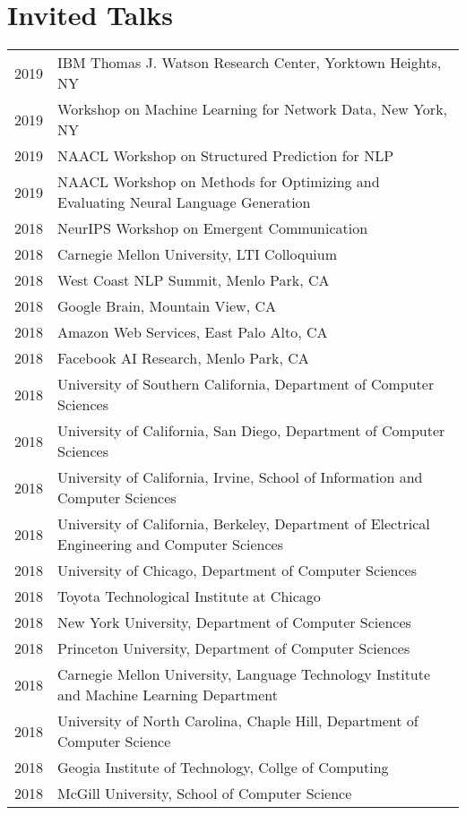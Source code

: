 \documentclass[a4paper,11pt]{article}
\begin{document}
\section{Invited Talks}
\begin{longtable}{rl}
    2019 & IBM Thomas J. Watson Research Center, Yorktown Heights, NY \\
    2019 & Workshop on Machine Learning for Network Data, New York, NY \\
    2019 & NAACL Workshop on Structured Prediction for NLP \\
    2019 & NAACL Workshop on Methods for Optimizing and Evaluating Neural Language Generation \\
    2018 & NeurIPS Workshop on Emergent Communication \\
    2018 & Carnegie Mellon University, LTI Colloquium \\
    2018 & West Coast NLP Summit, Menlo Park, CA \\
    2018 & Google Brain, Mountain View, CA \\
    2018 & Amazon Web Services, East Palo Alto, CA \\
    2018 & Facebook AI Research, Menlo Park, CA \\
    2018 & University of Southern California, Department of Computer Sciences \\
    2018 & University of California, San Diego, Department of Computer Sciences \\
    2018 & University of California, Irvine, School of Information and Computer Sciences \\
    2018 & University of California, Berkeley, Department of Electrical Engineering and Computer Sciences \\
    2018 & University of Chicago, Department of Computer Sciences \\
    2018 & Toyota Technological Institute at Chicago \\
    2018 & New York University, Department of Computer Sciences \\
    2018 & Princeton University, Department of Computer Sciences \\
    2018 & Carnegie Mellon University, Language Technology Institute and Machine Learning Department \\
    2018 & University of North Carolina, Chaple Hill, Department of Computer Science \\
    2018 & Geogia Institute of Technology, Collge of Computing \\
    2018 & McGill University, School of Computer Science \\

\end{longtable}
\end{document}

